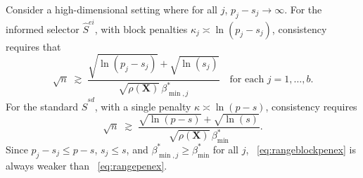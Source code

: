\documentclass[
  12pt]{article}
\newcommand{\bX}{\mathbf{X}}
\begin{document}
Consider a high-dimensional setting where for all $j$, $p_j-s_j\to\infty$. For the informed selector $\hat S^{ei}$, with block penalties $\kappa_j \asymp \ln(p_j-s_j)$, consistency requires that
\begin{equation}\label{eq:rangeblockpenex}
\sqrt{n}
\;\gtrsim\;
\frac{\sqrt{\ln(p_j-s_j)}+\sqrt{\ln(s_j)}}{\sqrt{\rho(\bX)}\,\beta^*_{\min,j}}\quad\text{for each }j=1,\ldots,b.
\end{equation}
For the standard $\hat S^{sd}$, with a single penalty $\kappa \asymp \ln(p-s)$, consistency requires
\begin{equation}\label{eq:rangepenex}
\sqrt{n}
\;\gtrsim\;
\frac{\sqrt{\ln(p-s)}+\sqrt{\ln(s)}}{\sqrt{\rho(\bX)}\,\beta^*_{\min}}.
\end{equation}
Since $p_j-s_j \le p-s$, $s_j \le s$, and $\beta^*_{\min,j} \ge \beta^*_{\min}$ for all $j$, ~\eqref{eq:rangeblockpenex} is always weaker than ~\eqref{eq:rangepenex}.
\end{document}
